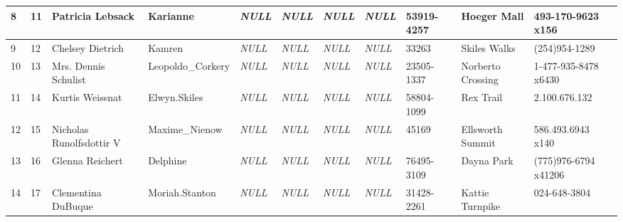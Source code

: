 \begin{longtable}{|l|l|l|l|l|l|l|l|l|l|l|}
8 & 11 & Patricia Lebsack & Karianne & \textit{NULL} & \textit{NULL} & \textit{NULL} & \textit{NULL} & 53919-4257 & Hoeger Mall & 493-170-9623 x156 \\ \hline 
9 & 12 & Chelsey Dietrich & Kamren & \textit{NULL} & \textit{NULL} & \textit{NULL} & \textit{NULL} & 33263 & Skiles Walks & (254)954-1289 \\ \hline 
10 & 13 & Mrs. Dennis Schulist & Leopoldo\_Corkery & \textit{NULL} & \textit{NULL} & \textit{NULL} & \textit{NULL} & 23505-1337 & Norberto Crossing & 1-477-935-8478 x6430 \\ \hline 
11 & 14 & Kurtis Weissnat & Elwyn.Skiles & \textit{NULL} & \textit{NULL} & \textit{NULL} & \textit{NULL} & 58804-1099 & Rex Trail & 2.100.676.132 \\ \hline 
12 & 15 & Nicholas Runolfsdottir V & Maxime\_Nienow & \textit{NULL} & \textit{NULL} & \textit{NULL} & \textit{NULL} & 45169 & Ellsworth Summit & 586.493.6943 x140 \\ \hline 
13 & 16 & Glenna Reichert & Delphine & \textit{NULL} & \textit{NULL} & \textit{NULL} & \textit{NULL} & 76495-3109 & Dayna Park & (775)976-6794 x41206 \\ \hline 
14 & 17 & Clementina DuBuque & Moriah.Stanton & \textit{NULL} & \textit{NULL} & \textit{NULL} & \textit{NULL} & 31428-2261 & Kattie Turnpike & 024-648-3804 \\ \hline 
 \end{longtable}
